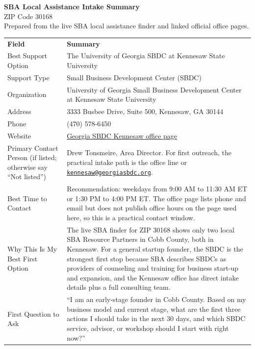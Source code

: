 \documentclass[11pt]{article}
\begin{document}
\begin{center}
{\LARGE\bfseries SBA Local Assistance Intake Summary}\\[3pt]
{\large ZIP Code 30168}\\[3pt]
\small Prepared from the live SBA local assistance finder and linked official office pages.
\end{center}

\begin{tabularx}{\textwidth}{L{0.33\textwidth}Y}
\textbf{Field} & \textbf{Summary} \\
Best Support Option & The University of Georgia SBDC at Kennesaw State University \\
Support Type & Small Business Development Center (SBDC) \\
Organization & University of Georgia Small Business Development Center at Kennesaw State University \\
Address & 3333 Busbee Drive, Suite 500, Kennesaw, GA 30144 \\
Phone & (470) 578-6450 \\
Website & \href{https://georgiasbdc.org/locations/kennesaw-office/}{Georgia SBDC Kennesaw office page} \\
Primary Contact Person (if listed; otherwise say ``Not listed'') & Drew Tonsmeire, Area Director. For first outreach, the practical intake path is the office line or \href{mailto:kennesaw@georgiasbdc.org}{\nolinkurl{kennesaw@georgiasbdc.org}}. \\
Best Time to Contact & Recommendation: weekdays from 9:00 AM to 11:30 AM ET or 1:30 PM to 4:00 PM ET. The office page lists phone and email but does not publish office hours on the page used here, so this is a practical contact window. \\
Why This Is My Best First Option & The live SBA finder for ZIP 30168 shows only two local SBA Resource Partners in Cobb County, both in Kennesaw. For a general startup founder, the SBDC is the strongest first stop because SBA describes SBDCs as providers of counseling and training for business start-up and expansion, and the Kennesaw office has direct intake details plus a full consulting team. \\
First Question to Ask & ``I am an early-stage founder in Cobb County. Based on my business model and current stage, what are the first three actions I should take in the next 30 days, and which SBDC service, advisor, or workshop should I start with right now?'' \\
\end{tabularx}
\end{document}
